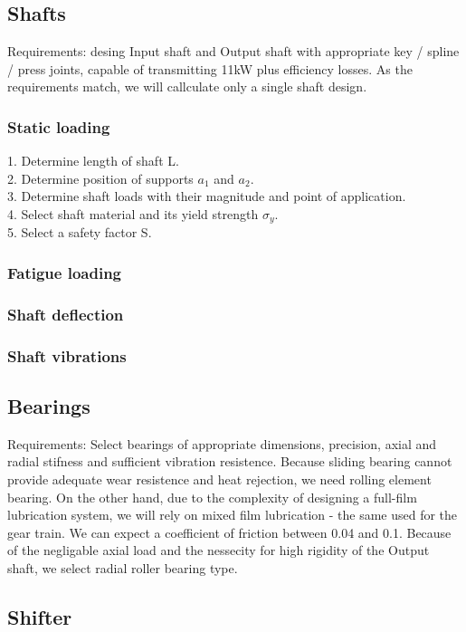 \documentclass{article}
\begin{document}
\subsection{Shafts}
Requirements: desing Input shaft and Output shaft with appropriate key / spline / press  joints, capable of transmitting 11kW plus efficiency losses.
As the requirements match, we will callculate only a single shaft design.
\subsubsection{Static loading}
1. Determine length of shaft L. \\
2. Determine position of supports $a_1$ and $a_2$. \\
3. Determine shaft loads with their magnitude and point of application. \\
4. Select shaft material and its yield strength $\sigma_y$. \\
5. Select a safety factor S. \\
\subsubsection{Fatigue loading}
\subsubsection{Shaft deflection}
\subsubsection{Shaft vibrations}
\FPeval{}
\vExample

\subsection{Bearings}
Requirements: Select bearings of appropriate dimensions, precision, axial and radial stifness and sufficient vibration resistence.
Because sliding bearing cannot provide adequate wear resistence and heat rejection, we need rolling element bearing.
On the other hand, due to the complexity of designing a full-film lubrication system, we will rely on mixed film lubrication - the same used for the gear train.
We can expect a coefficient of friction between 0.04 and 0.1.
Because of the negligable axial load and the nessecity for high rigidity of the Output shaft, we select radial roller bearing type.

\subsection{Shifter}
\end{document}
